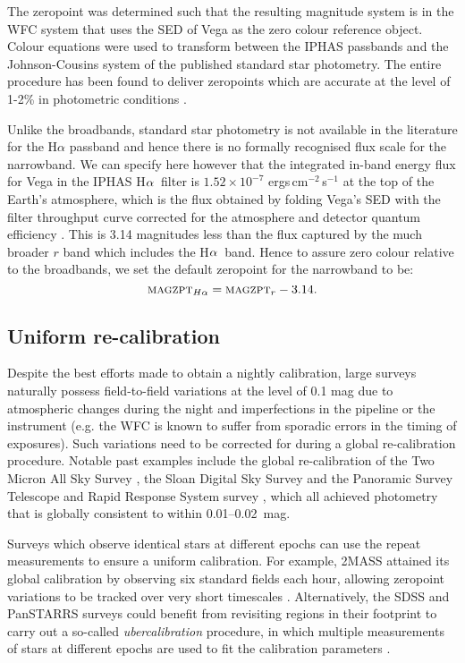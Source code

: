 \documentclass[useAMS,usenatbib]{mn2e}
\def\ha{\mbox{H$\rm \alpha$}}
\begin{document}
The zeropoint was determined such that the resulting magnitude system
is in the WFC system that uses the SED of Vega 
as the zero colour reference object. 
Colour equations were used to transform between the IPHAS passbands 
and the Johnson-Cousins system 
of the published standard star photometry.
The entire procedure has been found to deliver zeropoints which 
are accurate at the level of 1-2\% 
in photometric conditions \citep{Gonzalez-Solares2011}.

Unlike the broadbands, 
standard star photometry is not available in the literature 
for the H$\alpha$ passband
and hence there is no formally recognised flux scale 
for the narrowband.
We can specify here however 
that the integrated in-band energy flux for Vega 
in the IPHAS \ha\ filter 
is $1.52 \times 10^{-7}$ ergs\,cm$^{-2}$\,s$^{-1}$ 
at the top of the Earth's atmosphere,
which is the flux obtained by folding 
Vega's SED with the filter throughput curve 
corrected for the atmosphere and detector quantum efficiency
\citep[following the method explained by][]{Drew2005}.
This is 3.14 magnitudes less than the flux captured 
by the much broader $r$ band
which includes the \ha\ band.
Hence to assure zero colour relative to the broadbands,
we set the default zeropoint for the narrowband to be:
\begin{equation}
\textsc{magzpt}_{H\alpha} = \textsc{magzpt}_r - 3.14.
\label{eqn:zpha}
\end{equation}

\subsection{Uniform re-calibration}

Despite the best efforts made to obtain a nightly calibration,
large surveys naturally possess field-to-field variations
at the level of 0.1 mag
due to atmospheric changes during the night
and imperfections in the pipeline or the instrument
(e.g. the WFC is known to suffer from sporadic errors
in the timing of exposures).
Such variations need to be corrected for 
during a global re-calibration procedure.
Notable past examples include the global re-calibration 
of the Two Micron All Sky Survey \citep[2MASS;][]{Nikolaev2000},
the Sloan Digital Sky Survey \citep[SDSS;][]{Padmanabhan2008}
and the Panoramic Survey Telescope 
and Rapid Response System survey \citep[Pan-STARRS;][]{Schlafly2012},
which all achieved photometry 
that is globally consistent to within 0.01--0.02~mag.

Surveys which observe identical stars at different epochs
can use the repeat measurements to ensure a uniform calibration.
For example, 2MASS attained its global calibration
by observing six standard fields each hour, 
allowing zeropoint variations to be tracked 
over very short timescales \citep{Nikolaev2000}.
Alternatively, the SDSS and PanSTARRS surveys could benefit
from revisiting regions in their footprint to 
carry out a so-called \emph{ubercalibration} procedure,
in which multiple measurements of stars at different epochs
are used to fit the calibration parameters
\citep[e.g.][]{Ivezic2007,Padmanabhan2008,Schlafly2012}.
\end{document}
